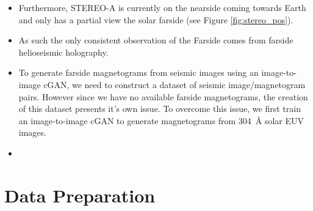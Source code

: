 \documentclass[11pt,a4paper,onecolumn]{report}
\begin{document}
\begin{itemize}
  \item Furthermore, STEREO-A is currently on the nearside coming towards Earth
  and only has a partial view the solar farside (see Figure
  \ref{fig:stereo_pos}).

  \item As such the only consistent observation of the Farside comes from
  farside helioseismic holography.

  \item To generate farside magnetograms from seismic images using an
  image-to-image cGAN, we need to construct a dataset of seismic
  image/magnetogram pairs. However since we have no available farside
  magnetograms, the creation of this dataset presents it's own issue. To
  overcome this issue, we first train an image-to-image cGAN to generate
  magnetograms from \SI{304}{\angstrom} solar EUV images.

\end{itemize}



\begin{itemize}
  \item 
\end{itemize}



%
%
%
%
\chapter{Data Preparation}
\label{chap:data}
%
%
%
%
\end{document}
